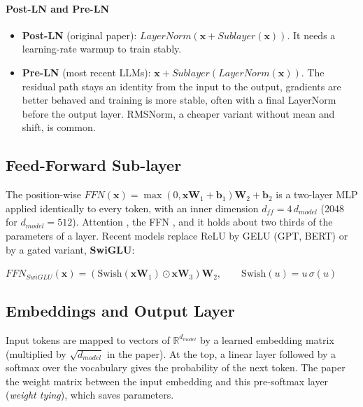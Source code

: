 \paragraph{Post-LN and Pre-LN}
\begin{itemize}
    \item \textbf{Post-LN} (original paper): $LayerNorm\left(\bm{x}+Sublayer(\bm{x})\right)$.
        It needs a learning-rate warmup to train stably.
    \item \textbf{Pre-LN} (most recent LLMs): $\bm{x}+Sublayer\left(LayerNorm(\bm{x})\right)$.
        The residual path stays an identity from the input to the output, gradients are
        better behaved and training is more stable, often with a final LayerNorm before the
        output layer. RMSNorm, a cheaper variant without mean and shift, is common.
\end{itemize}

\subsection{Feed-Forward Sub-layer}
The position-wise $FFN(\bm{x}) = \max\left(0,\bm{x}\bm{W}_{1}+\bm{b}_{1}\right)\bm{W}_{2}
+\bm{b}_{2}$ is a two-layer MLP applied identically to every token, with an inner dimension
$d_{ff}=4\,d_{model}$ (2048 for $d_{model}=512$). Attention , the FFN , and it holds about
two thirds of the parameters of a layer. Recent models replace ReLU by GELU (GPT, BERT) or
by a gated variant, \textbf{SwiGLU}:
\begin{center}
    $FFN_{SwiGLU}(\bm{x}) = \left(\mathrm{Swish}(\bm{x}\bm{W}_{1})\odot\bm{x}\bm{W}_{3}\right)
    \bm{W}_{2},\qquad \mathrm{Swish}(u)=u\,\sigma(u)$
\end{center}

\subsection{Embeddings and Output Layer}
Input tokens are mapped to vectors of $\mathbb{R}^{d_{model}}$ by a learned embedding matrix
(multiplied by $\sqrt{d_{model}}$ in the paper). At the top, a linear layer followed by a
softmax over the vocabulary gives the probability of the next token. The paper 
the weight matrix between the input embedding and this pre-softmax layer (\emph{weight
tying}), which saves parameters.

